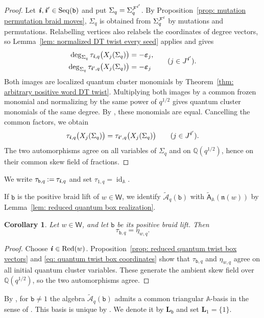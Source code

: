 \documentclass[12pt, leqno]{amsart}
\numberwithin{equation}{section}
\theoremstyle{plain}
\newtheorem{corollary}[lemma]{Corollary}
\theoremstyle{definition}
\newcommand{\seteq}{\mathbin{:=}}
\newcommand{\n}{\mathfrak{n}}
\newcommand{\Q}{\mathbb{Q}}
\newcommand{\ve}{\boldsymbol{\varepsilon}}
\newcommand{\ii}{ \textbf{\textit{i}}}
\newcommand{\sfA}{\mathsf{A}}
\newcommand{\sfW}{\mathsf{W}}
\newcommand{\tsfA}{\widetilde{\sfA}}
\newcommand{\bbA}{\mathbb{A}}
\newcommand{\bfL}{\mathbf{L}}
\newcommand{\calA}{\mathcal{A}}
\newcommand{\calF}{\mathcal{F}}
\newcommand{\tcalA}{\widetilde{\calA}}
\newcommand{\ttb}{\mathtt{b}}
\newcommand{\weyl}{\sfW}
\newcommand{\Red}{\mathrm{Red}}
\newcommand{\Seq}{\mathrm{Seq}}
\begin{document}
\begin{proof}
Let $\ii,\ii'\in\Seq(\ttb)$ and put
$\Sigma_q=\Sigma_q^{\calF^{\ii'}}$.
By Proposition~\ref{prop: mutation permutation braid moves},
$\Sigma_q$ is obtained from $\Sigma_q^{\calF^\ii}$ by mutations
and permutations.
Relabelling vertices also relabels the coordinates of degree
vectors, so Lemma~\ref{lem: normalized DT twist every seed}
applies and gives
\[
\begin{aligned}
\deg_{\Sigma_q}
\tau_{\ii,q}\bigl(X_j(\Sigma_q)\bigr)
&=-\ve_j,\\
\deg_{\Sigma_q}
\tau_{\ii',q}\bigl(X_j(\Sigma_q)\bigr)
&=-\ve_j
\end{aligned}
\qquad(j\in J^{\ii'}).
\]
Both images are localized quantum cluster monomials by
Theorem~\ref{thm: arbitrary positive word DT twist}.
Multiplying both images by a common frozen monomial and
normalizing by the same power of $q^{1/2}$ gives quantum cluster
monomials of the same degree.
By \cite[Theorem~A.8]{FHOO2}, these monomials are equal.
Cancelling the common factors, we obtain
\[
\tau_{\ii,q}\bigl(X_j(\Sigma_q)\bigr)
=
\tau_{\ii',q}\bigl(X_j(\Sigma_q)\bigr)
\qquad(j\in J^{\ii'}).
\]
The two automorphisms agree on all variables of $\Sigma_q$
and on $\Q(q^{1/2})$, hence on their common skew field of
fractions.
\end{proof}
We write $\tau_{\ttb,q}\seteq\tau_{\ii,q}$ and set
$\tau_{1,q}=\operatorname{id}_{\bbA}$.

If $\ttb$ is the positive braid lift of $w\in\weyl$, we identify
$\tcalA_q(\ttb)$ with $\tsfA_\bbA(\n(w))$ by
Lemma~\ref{lem: reduced quantum box realization}.

\begin{corollary}
\label{cor: reduced quantum twist recovered}
Let $w\in\weyl$, and let $\ttb$ be its positive braid lift.  Then
\[
\tau_{\ttb,q}=\eta_{w,q}.
\]
\end{corollary}

\begin{proof}
Choose $\ii\in\Red(w)$.
Proposition~\ref{prop: reduced quantum twist box vectors} and
\eqref{eq: quantum twist box coordinates} show that
$\tau_{\ttb,q}$ and $\eta_{w,q}$ agree on all initial quantum
cluster variables.  These generate the ambient skew field over
$\Q(q^{1/2})$, so the two automorphisms agree.
\end{proof}

By \cite[Theorems~6.13(1) and~6.14]{Qin24A}, for $\ttb\ne1$
the algebra $\tcalA_q(\ttb)$ admits a common triangular
$\bbA$-basis in the sense of
\cite[Definitions~6.2.1--6.2.2]{Qin20}.
This basis is unique by \cite[Lemma~6.2.4]{Qin20}.
We denote it by $\bfL_\ttb$ and set $\bfL_1=\{1\}$.
\end{document}
